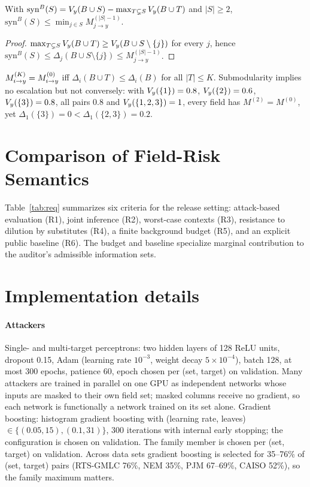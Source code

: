 \begin{proposition}\label{prop:syn}
With $\mathrm{syn}^B(S)=V_y(B\cup S)-\max_{T\subsetneq S}V_y(B\cup T)$ and $|S|\ge 2$,
$\mathrm{syn}^B(S)\le\min_{j\in S}M^{(|S|-1)}_{j\to y}$.
\end{proposition}
\begin{proof}
$\max_{T\subsetneq S}V_y(B\cup T)\ge V_y(B\cup S\setminus\{j\})$ for every $j$, hence
$\mathrm{syn}^B(S)\le\Delta_j(B\cup S\setminus\{j\})\le M^{(|S|-1)}_{j\to y}$.
\end{proof}

\begin{remark}
$M^{(K)}_{i\to y}=M^{(0)}_{i\to y}$ iff $\Delta_i(B\cup T)\le\Delta_i(B)$ for all $|T|\le K$. Submodularity implies no
escalation but not conversely: with $V_y(\{1\})=0.8$, $V_y(\{2\})=0.6$, $V_y(\{3\})=0.8$, all pairs $0.8$
and $V_y(\{1,2,3\})=1$, every field has $M^{(2)}=M^{(0)}$, yet $\Delta_1(\{3\})=0<\Delta_1(\{2,3\})=0.2$.
\end{remark}

\section{Comparison of Field-Risk Semantics}\label{app:requirements}
Table~\ref{tab:req} summarizes six criteria for the release setting: attack-based evaluation (R1), joint inference (R2), worst-case contexts (R3), resistance to dilution by substitutes (R4), a finite background budget (R5), and an explicit public baseline (R6). The budget and baseline specialize marginal contribution to the auditor's admissible information sets.


\section{Implementation details}\label{app:impl}

\paragraph{Attackers} Single- and multi-target perceptrons: two hidden layers of 128 ReLU units,
dropout 0.15, Adam (learning rate $10^{-3}$, weight decay $5\times10^{-4}$), batch 128, at most 300
epochs, patience 60, epoch chosen per (set, target) on validation. Many attackers are trained in
parallel on one GPU as independent networks whose inputs are masked to their own field set; masked
columns receive no gradient, so each network is functionally a network trained on its set alone.
Gradient boosting: histogram gradient boosting with (learning rate, leaves) $\in\{(0.05,15),(0.1,31)\}$,
300 iterations with internal early stopping; the configuration is chosen on validation. The family
member is chosen per (set, target) on validation. Across data sets gradient boosting is selected for
35--76\% of (set, target) pairs (RTS-GMLC 76\%, NEM 35\%, PJM 67--69\%, CAISO 52\%), so the family maximum matters.

